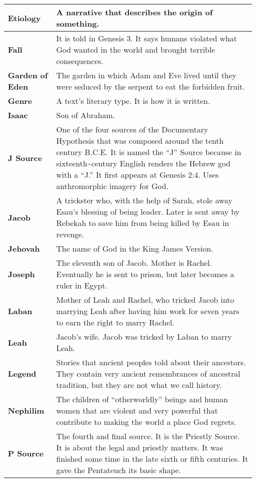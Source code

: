 \documentclass{report}
\begin{document}
\begin{center}
\begin{longtable}{| p{5cm} | p{7cm} |}
                \textbf{Etiology} & A narrative that describes the origin of something.\\ \hline
                \textbf{Fall} & It is told in Genesis 3. It says humans violated what God wanted in the world and brought terrible consequences.\\ \hline
                \textbf{Garden of Eden} & The garden in which Adam and Eve lived until they were seduced by the serpent to eat the forbidden fruit.\\ \hline
                \textbf{Genre} & A text's literary type. It is how it is written.\\ \hline
                \textbf{Isaac} & Son of Abraham.\\ \hline
                \textbf{J Source} & One of the four sources of the Documentary Hypothesis that was composed around the tenth century B.C.E. It is named the ``J'' Source because in sixteenth\texttt{-}century English renders the Hebrew god with a ``J.'' It first appears at Genesis 2:4. Uses anthromorphic imagery for God.\\ \hline
                \textbf{Jacob} & A trickster who, with the help of Sarah, stole away Esau's blessing of being leader. Later is sent away by Rebekah to save him from being killed by Esau in revenge.\\ \hline
                \textbf{Jehovah} & The name of God in the King James Version.\\ \hline
                \textbf{Joseph} & The eleventh son of Jacob. Mother is Rachel. Eventually he is sent to prison, but later becomes a ruler in Egypt.\\ \hline
                \textbf{Laban} & Mother of Leah and Rachel, who tricked Jacob into marrying Leah after having him work for seven years to earn the right to marry Rachel.\\ \hline
                \textbf{Leah} & Jacob's wife. Jacob was tricked by Laban to marry Leah.\\ \hline
                \textbf{Legend} & Stories that ancient peoples told about their ancestors. They contain very ancient remembrances of ancestral tradition, but they are not what we call history.\\ \hline
                \textbf{Nephilim} & The children of ``otherworldly'' beings and human women that are violent and very powerful that contribute to making the world a place God regrets.\\ \hline
                \textbf{P Source} & The fourth and final source. It is the Priestly Source. It is about the legal and priestly matters. It was finished some time in the late sixth or fifth centuries. It gave the Pentateuch its basic shape.\\ \hline

\end{longtable}
\end{center}
\end{document}
